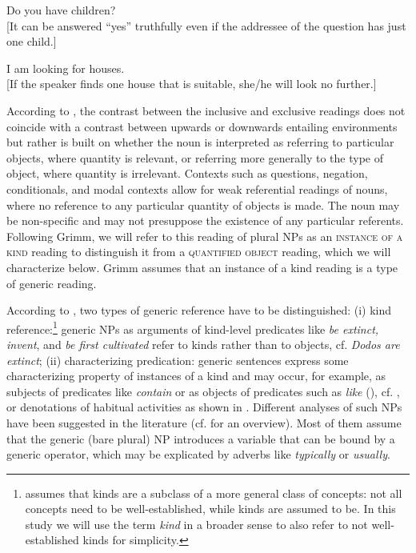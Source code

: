 \documentclass[output=paper,colorlinks,citecolor=brown]{langscibook}
\begin{document}
\ea\label{ex:geist:8}
Do you have children? \\
{[}It can be answered ``yes'' truthfully even if the addressee of the question has just one child.{]}
\z
	
\ea\label{ex:geist:9}
I am looking for houses. \hfill \citep[249]{Grimm2013} \\
{[}If the speaker finds one house that is suitable, she/he will look no further.{]}
\z

\noindent According to \citet{Grimm2013}, the contrast between the inclusive and exclusive readings does not coincide with a contrast between upwards or downwards entailing environments but rather is built on whether the noun is interpreted as referring to particular objects, where quantity is relevant, or referring more generally to the type of object, where quantity is irrelevant. Contexts such as questions, negation, conditionals, and modal contexts allow for weak referential readings of nouns, where no reference to any particular quantity of objects is made. The noun may be non-specific and may not presuppose the existence of any particular referents. Following Grimm, we will refer to this reading of plural NPs as an \textsc{instance of a kind} reading to distinguish it from a \textsc{quantified object} reading, which we will characterize below. Grimm assumes that an instance of a kind reading is a type of generic reading. 

According to \citet{KrifkaTerMeulen1995}, two types of generic reference have to be distinguished: (i) kind reference:\footnote{\citet{Krifka1995} assumes that kinds are a subclass of a more general class of concepts: not all concepts need to be well-established, while kinds are assumed to be. In this study we will use the term \textit{kind} in a broader sense to also refer to not well-established kinds for simplicity.} generic NPs as arguments of kind-level predicates like \textit{be extinct, invent}, and \textit{be first cultivated} refer to kinds rather than to objects, cf. \textit{Dodos are extinct}; (ii) characterizing predication: generic sentences express some characterizing property of instances of a kind and may occur, for example, as subjects of predicates like \textit{contain} or as objects of predicates such as \textit{like} (\citealt[71f]{KrifkaTerMeulen1995}), cf. , or denotations of habitual activities as shown in . Different analyses of such NPs have been suggested in the literature (cf. \citealt{gb:Krifka2004} for an overview). Most of them assume that the generic (bare plural) NP introduces a variable that can be bound by a generic operator, which may be explicated by adverbs like \textit{typically} or \textit{usually}.
\end{document}

